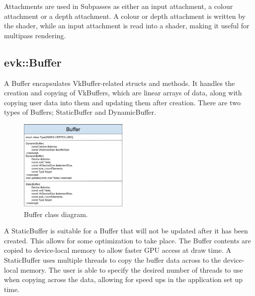 \documentclass[12pt]{report}
\newcommand{\imagewidth}{0.47\textwidth}
\theoremstyle{definition}
\begin{document}
        Attachments are used in Subpasses as either an input attachment, a
        colour attachment or a depth attachment. A colour or depth attachment
        is written by the shader, while an input attachment is read into a
        shader, making it useful for multipass rendering.

      \subsection{evk::Buffer}

        A Buffer encapsulates VkBuffer-related structs and methods. It handles
        the creation and copying of VkBuffers, which are linear arrays of
        data, along with copying user data into them and updating them after
        creation. There are two types of Buffers; StaticBuffer and
        DynamicBuffer. \\

        \begin{figure}[h!]
          \centering
          \includegraphics[width=\imagewidth]{images/class_buffer.png}
          \caption{Buffer class diagram.}
          \label{fig:class_buffer}  
        \end{figure}

        A StaticBuffer is suitable for a Buffer that will not be
        updated after it has been created. This allows for some optimization
        to take place. The Buffer contents are copied to device-local memory
        to allow faster GPU access at draw time. A StaticBuffer uses multiple threads
        to copy the buffer data across to the device-local memory. The user is able
        to specify the desired number of threads to use when copying across the data,
        allowing for speed ups in the application set up time. \\
\end{document}
